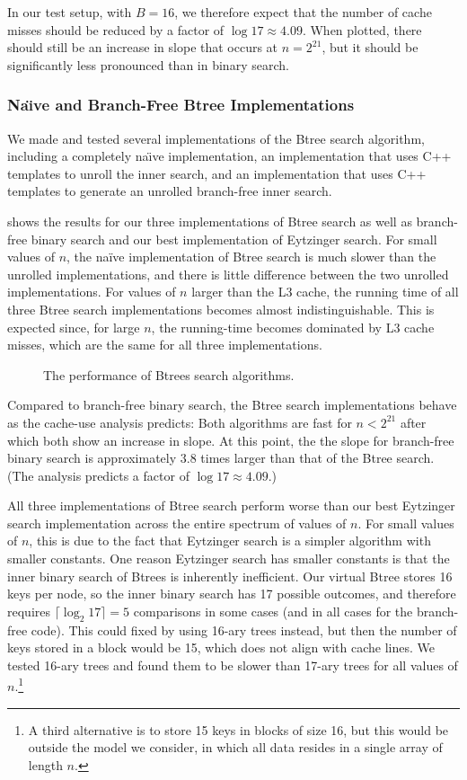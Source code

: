 \documentclass{patmorin}
\begin{document}
In our test setup, with $B=16$, we therefore expect that the number
of cache misses should be reduced by a factor of $\log 17\approx
4.09$. When plotted, there should still be an increase in slope that
occurs at $n=2^{21}$, but it should be significantly less pronounced
than in binary search.

\subsubsection{Na\"{\i}ve and Branch-Free Btree Implementations}

We made and tested several implementations of the Btree search algorithm,
including a completely na\"{\i}ve implementation, an implementation that
uses C++ templates to unroll the inner search, and an implementation
that uses C++ templates to generate an unrolled branch-free inner search.

 shows the results for our three implementations of
Btree search as well as branch-free binary search and our best implementation
of Eytzinger search.  For small values of $n$, the na\"ive implementation
of Btree search is much slower than the unrolled implementations, and there
is little difference between the two unrolled implementations. For values
of $n$ larger than the L3 cache, the running time of all three Btree
search implementations becomes almost indistinguishable. This is expected
since, for large $n$, the running-time becomes dominated by L3 cache
misses, which are the same for all three implementations.

\begin{figure}
   \caption{The performance of Btrees search algorithms.}
\end{figure}


Compared to branch-free binary search, the Btree search implementations
behave as the cache-use analysis predicts:  Both algorithms are fast for
$n<2^{21}$ after which both show an increase in slope. At this point,
the the slope for branch-free binary search is approximately 3.8 times
larger than that of the Btree search. (The analysis predicts a factor
of $\log 17\approx 4.09$.)

All three implementations of Btree search perform worse than our best
Eytzinger search implementation across the entire spectrum of values
of $n$.  For small values of $n$, this is due to the fact that Eytzinger
search is a simpler algorithm with smaller constants.  One reason
Eytzinger search has smaller constants is that the inner binary search
of Btrees is inherently inefficient. Our virtual Btree stores 16 keys per
node, so the inner binary search has 17 possible outcomes, and therefore
requires $\lceil\log_2 17\rceil=5$ comparisons in some cases (and in
all cases for the branch-free code).  This could fixed by using 16-ary
trees instead, but then the number of keys stored in a block would be 15,
which does not align with cache lines.  We tested 16-ary trees and found
them to be slower than 17-ary trees for all values of $n$.\footnote{A
third alternative is to store 15 keys in blocks of size 16, but this would
be outside the model we consider, in which all data resides in a single
array of length $n$.}
\end{document}
